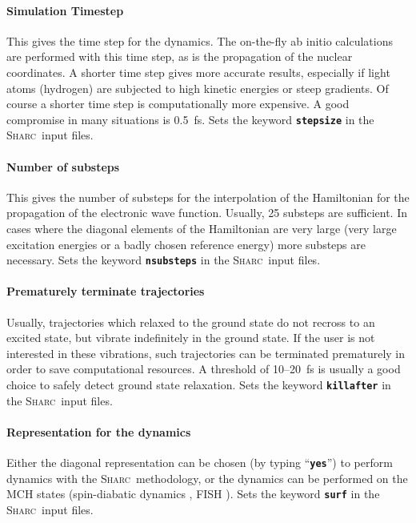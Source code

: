 \documentclass[a4paper,10pt,DIV=15,openany,twoside=false]{scrbook}
\newcommand{\sharc}{\textsc{Sharc}}
\newcommand{\ttt}[1]{\textbf{\texttt{#1}}}
\begin{document}
\paragraph{Simulation Timestep}

This gives the time step for the dynamics. The on-the-fly ab initio calculations are performed with this time step, as is the propagation of the nuclear coordinates. A shorter time step gives more accurate results, especially if light atoms (hydrogen) are subjected to high kinetic energies or steep gradients. Of course a shorter time step is computationally more expensive. A good compromise in many situations is 0.5~fs. Sets the keyword \ttt{stepsize} in the \sharc\ input files.

\paragraph{Number of substeps}

This gives the number of substeps for the interpolation of the Hamiltonian for the propagation of the electronic wave function. Usually, 25 substeps are sufficient. In cases where the diagonal elements of the Hamiltonian are very large (very large excitation energies or a badly chosen reference energy) more substeps are necessary. Sets the keyword \ttt{nsubsteps} in the \sharc\ input files.

\paragraph{Prematurely terminate trajectories}

Usually, trajectories which relaxed to the ground state do not recross to an excited state, but vibrate indefinitely in the ground state. If the user is not interested in these vibrations, such trajectories can be terminated prematurely in order to save computational resources. A threshold of 10--20~fs is usually a good choice to safely detect ground state relaxation. Sets the keyword \ttt{killafter} in the \sharc\ input files.

\paragraph{Representation for the dynamics}

Either the diagonal representation can be chosen (by typing ``\ttt{yes}'') to perform dynamics with the \sharc\ methodology, or the dynamics can be performed on the MCH states (spin-diabatic dynamics \cite{Granucci2012JCP}, FISH \cite{Mitric2009PRA}). Sets the keyword \ttt{surf} in the \sharc\ input files.
\end{document}

